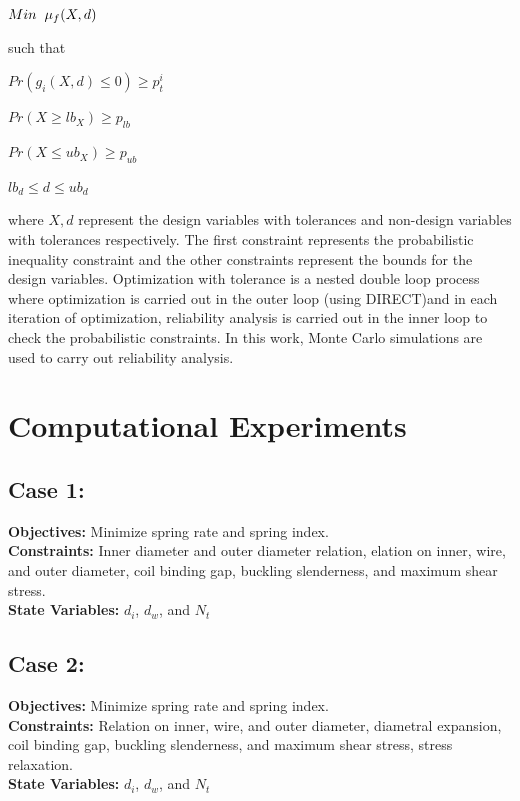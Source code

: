\documentclass[10pt]{article}
\begin{document}
\centerline{$Min \hspace{2mm} \mu_{f} (X,d)$}

such that

\centerline{$Pr(g_{i}(X,d) \leq 0)\geq p_{t}^{i}$}
\centerline{$Pr(X \geq lb_{X})\geq p_{lb}$}
\centerline{$Pr(X \leq ub_{X})\geq p_{ub}$}
\centerline{$lb_{d} \leq d \leq ub_{d}$}

\noindent where $X,d$ represent the design variables with tolerances and non-design variables with tolerances respectively. The first constraint represents the probabilistic inequality constraint and the other constraints represent the bounds for the design variables. Optimization with tolerance is a nested double loop process where optimization is carried out in the outer loop (using DIRECT)and in each iteration of optimization, reliability analysis is carried out in the inner loop to check the probabilistic constraints. In this work, Monte Carlo simulations are used to carry out reliability analysis. 

\cite{Derivative} \cite{DirectPaper} \cite{MATLAB:2014a} \cite{DirectUserGuide}
 
 

\section{Computational Experiments}
\label{sec:Experiments}

\newpage
\subsection{Case 1:}
\label{sec:Case1}
	\textbf{Objectives:} Minimize spring rate and spring index.\\
	\textbf{Constraints:} Inner diameter and outer diameter relation, elation on inner, wire, and outer diameter, coil binding gap, buckling slenderness, and maximum shear stress. \\
	\textbf{State Variables:} $d_{i}$, $d_{w}$, and $N_{t}$ \\

\newpage
\subsection{Case 2:}
\label{sec:Case2}

	\textbf{Objectives:} Minimize spring rate and spring index.\\
	\textbf{Constraints:} Relation on inner, wire, and outer diameter, diametral expansion, coil binding gap, buckling slenderness, and maximum shear stress, stress relaxation. \\
	\textbf{State Variables:} $d_{i}$, $d_{w}$, and $N_{t}$ \\
\end{document}
